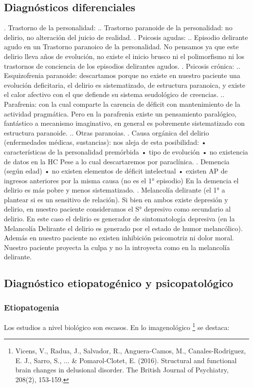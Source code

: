 \documentclass{scrbook}
\begin{document}
\subsection*{Diagnósticos diferenciales}
. Trastorno de la personalidad:
.. Trastorno paranoide de la personalidad: no delirio, no alteración del juicio de realidad.
. Psicosis agudas:
.. Episodio delirante agudo en un Trastorno paranoico de la personalidad. No pensamos ya que este delirio lleva años de evolución, no existe el inicio brusco ni el polimorfismo ni los trastornos de conciencia de los episodios delirantes agudos.
. Psicosis crónica:
.. Esquizofrenia paranoide: descartamos porque no existe en nuestro paciente una evolución deficitaria, el delirio es sistematizado, de estructura paranoica, y existe el calor afectivo con el que defiende su sistema seudológico de creencias.
.. Parafrenia: con la cual comparte la carencia de déficit con mantenimiento de la actividad pragmática. Pero en la parafrenia existe un pensamiento paralógico, fantástico a mecanismo imaginativo, en general es pobremente sistematizado con estructura paranoide.
.. Otras paranoias.
. Causa orgánica del delirio (enfermedades médicas, sustancias): nos aleja de esta posibilidad: • características de la personalidad premórbida • tipo de evolución • no existencia de datos en la HC Pese a lo cual descartaremos por paraclínica.
. Demencia (según edad) • no existen elementos de déficit intelectual • existen AP de ingresos anteriores por la misma causa (no es el 1° episodio) En la demencia el delirio es más pobre y menos sistematizado.
. Melancolía delirante (el 1° a plantear si es un sensitivo de relación). Si bien en ambos existe depresión y delirio, en nuestro paciente consideramos el S° depresivo como secundario al delirio. En este caso el delirio es generador de sintomatología depresiva (en la Melancolía Delirante el delirio es generado por el estado de humor melancólico). Además en nuestro paciente no existen inhibición psicomotriz ni dolor moral. Nuestro paciente proyecta la culpa y no la introyecta como en la melancolía delirante.

\subsection*{Diagnóstico etiopatogénico y psicopatológico}
\subsubsection*{Etiopatogenia}
Los estudios a nivel biológico son escasos. En lo imagenológico \footnote{Vicens, V., Radua, J., Salvador, R., Anguera-Camos, M., Canales-Rodriguez, E. J., Sarro, S., ... \& Pomarol-Clotet, E. (2016). Structural and functional brain changes in delusional disorder. The British Journal of Psychiatry, 208(2), 153-159.} se destaca:
\end{document}
